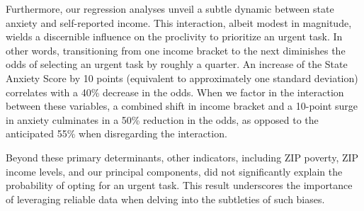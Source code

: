 \documentclass[
]{report}
\begin{document}
Furthermore, our regression analyses unveil a subtle dynamic between
state anxiety and self-reported income. This interaction, albeit modest
in magnitude, wields a discernible influence on the proclivity to
prioritize an urgent task. In other words, transitioning from one income
bracket to the next diminishes the odds of selecting an urgent task by
roughly a quarter. An increase of the State Anxiety Score by 10 points
(equivalent to approximately one standard deviation) correlates with a
40\% decrease in the odds. When we factor in the interaction between
these variables, a combined shift in income bracket and a 10-point surge
in anxiety culminates in a 50\% reduction in the odds, as opposed to the
anticipated 55\% when disregarding the interaction.

Beyond these primary determinants, other indicators, including ZIP
poverty, ZIP income levels, and our principal components, did not
significantly explain the probability of opting for an urgent task. This
result underscores the importance of leveraging reliable data when
delving into the subtleties of such biases.
\end{document}
